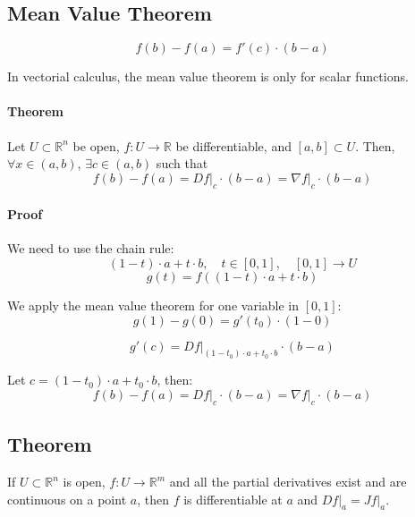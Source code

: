\documentclass[11pt]{article}
\begin{document}
\subsection{Mean Value Theorem}
\[
f(b) - f(a) = f'(c) \cdot (b - a)
\]

In vectorial calculus, the mean value theorem is only for scalar functions.

\paragraph{Theorem}
Let $U \subset \mathbb{R}^n$ be open, $f : U \rightarrow \mathbb{R}$ be differentiable, and $[a,b] \subset U$. Then, $\forall x \in (a,b)$, $\exists c \in (a,b)$ such that
\[
f(b) - f(a) = Df \big|_c \cdot (b - a) = \nabla f \big|_c \cdot (b - a)
\]

\paragraph{Proof}
We need to use the chain rule:
\[
(1 - t) \cdot a + t \cdot b, \quad t \in [0,1], \quad [0,1] \rightarrow U
\]
\[
g(t) = f((1 - t) \cdot a + t \cdot b)
\]

We apply the mean value theorem for one variable in $[0,1]$:
\[
g(1) - g(0) = g'(t_0) \cdot (1 - 0)
\]

\[
g'(c) = Df \big|_{(1 - t_0) \cdot a + t_0 \cdot b} \cdot (b - a)
\]

Let $c = (1 - t_0) \cdot a + t_0 \cdot b$, then:
\[
f(b) - f(a) = Df \big|_c \cdot (b - a) = \nabla f \big|_c \cdot (b - a)
\]

\subsection{Theorem}
If $U \subset \mathbb{R}^n$ is open, $f : U \rightarrow \mathbb{R}^m$ and all the partial derivatives exist and are continuous on a point $a$, then $f$ is differentiable at $a$ and $Df \big|_a = Jf \big|_a$.
\end{document}
